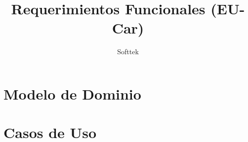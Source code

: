 \documentclass[10pt, letterpaper]{report}
\begin{document}
\title{Requerimientos Funcionales (EU-Car)}
\author{Softtek}
\date{}
\maketitle

\pagestyle{plain}
\tableofcontents


\chapter{Modelo de Dominio}


\chapter{Casos de Uso}
\end{document}
